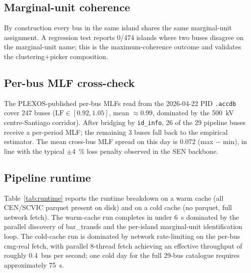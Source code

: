 \subsection{Marginal-unit coherence}
By construction every bus in the same island shares the same
marginal-unit assignment.  A regression test reports
\num{0}/\num{474} islands where two buses disagree on the
marginal-unit name; this is the maximum-coherence outcome and
validates the clustering+picker composition.

\subsection{Per-bus MLF cross-check}
The PLEXOS-published per-bus MLFs read from the
2026-04-22 PID \texttt{.accdb} cover \num{247} buses
($\mathrm{LF}\in[0.92,1.05]$, mean $\approx0.99$, dominated by the
\SI{500}{\kV} centre-Santiago corridor).  After bridging by
\texttt{id\_info}, \num{26} of the \num{29} pipeline buses receive
a per-period MLF; the remaining \num{3} buses fall back to the
empirical estimator.  The mean cross-bus MLF spread on this day
is \num{0.072} (max $-$ min), in line with the typical $\pm$\SI{4}{\percent}
loss penalty observed in the SEN backbone.

\subsection{Pipeline runtime}
Table~\ref{tab:runtime} reports the runtime breakdown on a
warm cache (all CEN/SCVIC parquet present on disk) and on a cold
cache (no parquet, full network fetch).  The warm-cache run
completes in under \SI{6}{\second} dominated by the parallel
discovery of bar\_transfs and the per-island marginal-unit
identification loop.  The cold-cache run is dominated by
network rate-limiting on the per-bus cmg-real fetch, with
parallel \num{8}-thread fetch achieving an effective throughput of
roughly \num{0.4}~bus per second; one cold day for the full
\num{29}-bus catalogue requires approximately \SI{75}{\second}.

\begin{table}[t]
  \centering
  \caption{Pipeline runtime breakdown for 2026-04-22, on a
  warm cache (all parquet on disk) and on a cold cache (no parquet,
  full network fetch).}
  \label{tab:runtime}
  
\end{table}

